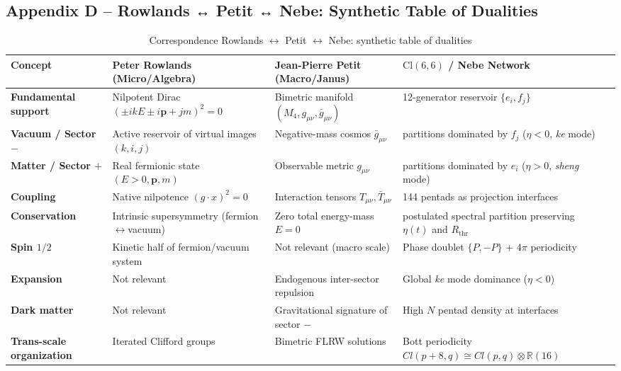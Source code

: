 \documentclass[11pt]{article}
\begin{document}
\hypertarget{appendix-d-rowlands-petit-nebe-synthetic-table-of-dualities}{%
\subsection{Appendix D -- Rowlands ↔ Petit ↔ Nebe: Synthetic Table of
Dualities}\label{appendix-d-rowlands-petit-nebe-synthetic-table-of-dualities}}

\begin{table}
\centering
\small
\begin{tabularx}{\textheight}{@{}lXXXX@{}}
\toprule
\textbf{Concept} & \textbf{Peter Rowlands (Micro/Algebra)} & \textbf{Jean-Pierre Petit (Macro/Janus)} & \textbf{$\text{Cl}(6,6)$ / Nebe Network} \\
\midrule
\textbf{Fundamental support} & Nilpotent Dirac $(\pm ikE \pm i\mathbf{p} + jm)^2=0$ & Bimetric manifold $(M_4, g_{\mu\nu}, \bar{g}_{\mu\nu})$ & 12-generator reservoir $\{e_i,f_j\}$ \\
\textbf{Vacuum / Sector $-$} & Active reservoir of virtual images $(k,i,j)$ & Negative-mass cosmos $\bar{g}_{\mu\nu}$ & partitions dominated by $f_j$ ($\eta <0$, \textit{ke} mode) \\
\textbf{Matter / Sector $+$} & Real fermionic state $(E >0,\mathbf{p},m)$ & Observable metric $g_{\mu\nu}$ & partitions dominated by $e_i$ ($\eta >0$, \textit{sheng} mode) \\
\textbf{Coupling} & Native nilpotence $(g\cdot x)^2=0$ & Interaction tensors $T_{\mu\nu},\bar{T}_{\mu\nu}$ & 144 pentads as projection interfaces \\
\textbf{Conservation} & Intrinsic supersymmetry (fermion$\leftrightarrow$vacuum) & Zero total energy-mass $E=0$ & postulated spectral partition preserving $\eta(t)$ and $R_{\text{thr}}$ \\
\textbf{Spin $1/2$} & Kinetic half of fermion/vacuum system & Not relevant (macro scale) & Phase doublet $\{P,-P\}$ + $4\pi$ periodicity \\
\textbf{Expansion} & Not relevant & Endogenous inter-sector repulsion & Global \textit{ke} mode dominance ($\eta <0$) \\
\textbf{Dark matter} & Not relevant & Gravitational signature of sector $-$ & High $N$ pentad density at interfaces \\
\textbf{Trans-scale organization} & Iterated Clifford groups & Bimetric FLRW solutions & Bott periodicity $Cl(p+8,q)\cong Cl(p,q)\otimes\mathbb{R}(16)$ \\
\bottomrule
\end{tabularx}
\caption{Correspondence Rowlands $\leftrightarrow$ Petit $\leftrightarrow$ Nebe: synthetic table of dualities}
\label{tab:dualities}
\end{table}
\end{document}
